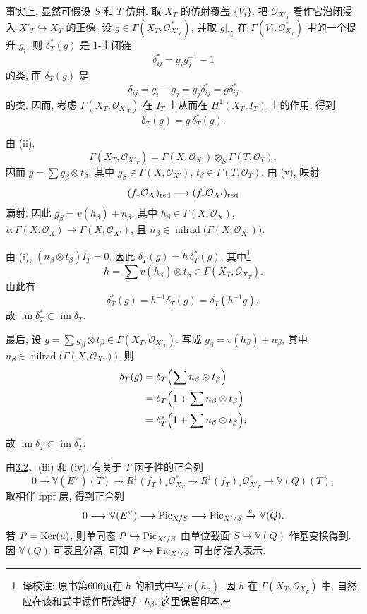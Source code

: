 事实上, 显然可假设 $S$ 和 $T$ 仿射. 取 $X_T$ 的仿射覆盖 $\{V_i\}$. 把 $\mathcal O_{X'_T}$ 看作它沿闭浸入 $X'_T\hookrightarrow X_T$ 的正像. 设 $g\in\Gamma(X_T,\mathcal O_{X'_T}^{*})$, 并取 $g|_{V_i}$ 在 $\Gamma(V_i,\mathcal O_{X_T}^{*})$ 中的一个提升 $g_i$. 则 $\delta_T^*(g)$ 是 $1$-上闭链
\[
  \delta_{ij}^*=g_i g_j^{-1}-1
\]
的类, 而 $\delta_T(g)$ 是
\[
  \delta_{ij}=g_i-g_j=g_j\delta_{ij}^*=g\delta_{ij}^*
\]
的类. 因而, 考虑 $\Gamma(X_T,\mathcal O_{X'_T})$ 在 $I_T$ 上从而在 $H^1(X_T,I_T)$ 上的作用, 得到
\[
  \delta_T(g)=g\,\delta_T^*(g).
\]

由 (ii),
\[
  \Gamma(X_T,\mathcal O_{X'_T})
  =\Gamma(X,\mathcal O_{X'})\otimes_S\Gamma(T,\mathcal O_T),
\]
因而 $g=\sum g_\beta\otimes t_\beta$, 其中 $g_\beta\in\Gamma(X,\mathcal O_{X'})$, $t_\beta\in\Gamma(T,\mathcal O_T)$. 由 (v), 映射
\[
  (f_*\mathcal O_X)_{\mathrm{red}}\longrightarrow
  (f_*\mathcal O_{X'})_{\mathrm{red}}
\]
满射. 因此 $g_\beta=v(h_\beta)+n_\beta$, 其中 $h_\beta\in\Gamma(X,\mathcal O_X)$, $v:\Gamma(X,\mathcal O_X)\to\Gamma(X,\mathcal O_{X'})$, 且 $n_\beta\in\operatorname{nilrad}\bigl(\Gamma(X,\mathcal O_{X'})\bigr)$.

由 (i), $(n_\beta\otimes t_\beta)I_T=0$. 因此 $\delta_T(g)=h\,\delta_T^*(g)$, 其中\footnote{译校注: 原书第606页在 $h$ 的和式中写 $v(h_\beta)$. 因 $h$ 在 $\Gamma(X_T,\mathcal O_{X_T})$ 中, 自然应在该和式中读作所选提升 $h_\beta$. 这里保留印本.}
\[
  h=\sum v(h_\beta)\otimes t_\beta
  \in\Gamma(X_T,\mathcal O_{X_T}).
\]
由此有
\[
  \delta_T^*(g)=h^{-1}\delta_T(g)=\delta_T(h^{-1}g),
\]
故 $\operatorname{im}\delta_T^*\subset\operatorname{im}\delta_T$.

最后, 设 $g=\sum g_\beta\otimes t_\beta\in\Gamma(X_T,\mathcal O_{X'_T})$. 写成 $g_\beta=v(h_\beta)+n_\beta$, 其中 $n_\beta\in\operatorname{nilrad}\bigl(\Gamma(X,\mathcal O_{X'})\bigr)$. 则
\[
\begin{split}
  \delta_T(g)
  &=\delta_T\Bigl(\sum n_\beta\otimes t_\beta\Bigr)\\
  &=\delta_T\Bigl(1+\sum n_\beta\otimes t_\beta\Bigr)\\
  &=\delta_T^*\Bigl(1+\sum n_\beta\otimes t_\beta\Bigr),
\end{split}
\]
故 $\operatorname{im}\delta_T\subset\operatorname{im}\delta_T^*$.

由\hyperlink{sga6.e12.para.3-2}{3.2}、(iii) 和 (iv), 有关于 $T$ 函子性的正合列
\[
  0\longrightarrow\mathbb V(E^\vee)(T)
  \longrightarrow R^1(f_T)_*\mathcal O_{X_T}^{*}
  \longrightarrow R^1(f_T)_*\mathcal O_{X'_T}^{*}
  \longrightarrow\mathbb V(Q)(T),
\]
取相伴 fppf 层, 得到正合列
\[
  0\longrightarrow\mathbb V(E^\vee)\longrightarrow\operatorname{Pic}_{X/S}
  \longrightarrow\operatorname{Pic}_{X'/S}\xrightarrow{u}\mathbb V(Q).
\]
若 $P=\operatorname{Ker}(u)$, 则单同态 $P\hookrightarrow\operatorname{Pic}_{X'/S}$ 由单位截面 $S\hookrightarrow\mathbb V(Q)$ 作基变换得到. 因 $\mathbb V(Q)$ 可表且分离, 可知 $P\hookrightarrow\operatorname{Pic}_{X'/S}$ 可由闭浸入表示.

